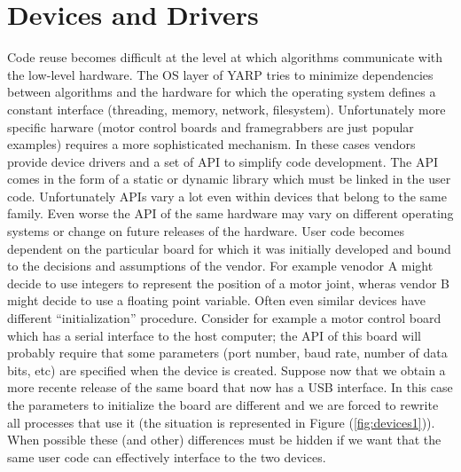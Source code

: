 \section{Devices and Drivers}

Code reuse becomes difficult at the level at which algorithms 
communicate with the low-level hardware. The OS layer of YARP tries 
to minimize dependencies between algorithms and the hardware for 
which the operating system defines a constant interface (threading, 
memory, network, filesystem). Unfortunately more specific harware 
(motor control boards and framegrabbers are just 
popular examples) requires a more sophisticated mechanism. In these 
cases vendors provide device drivers and a set of API to simplify 
code development. The API comes in the form of a static or dynamic 
library which must be linked in the user code. Unfortunately
APIs vary a lot even within devices that belong to the same family. 
Even worse the API of the same hardware may vary on different 
operating systems or change on future releases of the hardware. User 
code becomes dependent on the particular board for which it was initially developed 
and bound to the decisions and assumptions of the vendor. For 
example venodor A might decide to use integers to represent the position 
of a motor joint, wheras vendor B might decide to use a floating point
variable. Often even similar devices have different ``initialization'' 
procedure. Consider for example a motor control board which has a serial
interface to the host computer; the API of this board will probably require 
that some parameters (port number, baud rate, number of data bits, etc) are 
specified when the device is created. Suppose now that we obtain a more 
recente release of the same board that now has a USB interface. In this 
case the parameters to initialize the board are different and we are forced 
to rewrite all processes that use it (the situation is 
represented in Figure (\ref{fig:devices1})). When possible these (and other) 
differences must be hidden if we want that the same user code can 
effectively interface to the two devices.

